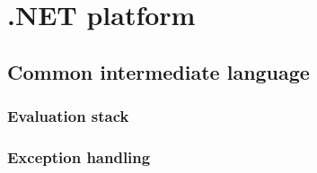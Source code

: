 \chapter{.NET platform}

\section{Common intermediate language}\label{CIL}

\subsection{Evaluation stack}

\subsection{Exception handling}
